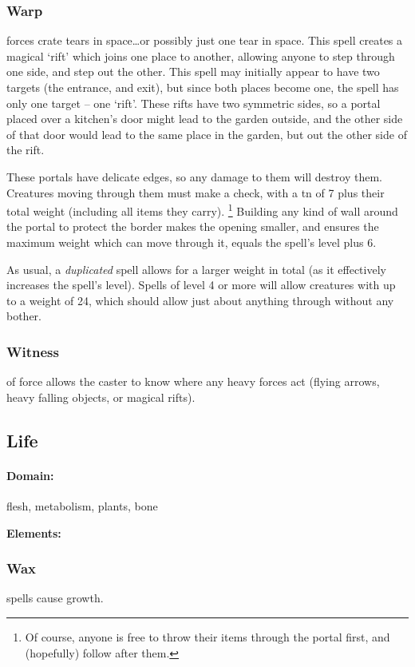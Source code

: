 \begin{multicols}{2}
\subsubsection{Warp}
forces crate tears in space\ldots or possibly just one tear in space.
This spell creates a magical `rift' which joins one place to another, allowing anyone to step through one side, and step out the other.
This spell may initially appear to have two targets (the entrance, and exit), but since both places become one, the spell has only one target -- one `rift'.
These rifts have two symmetric sides, so a portal placed over a kitchen's door might lead to the garden outside, and the other side of that door would lead to the same place in the garden, but out the other side of the rift.

These portals have delicate edges, so any damage to them will destroy them.
Creatures moving through them must make a  check, with a \gls{tn} of 7 plus their total \gls{weight} (including all items they carry).%
\footnote{Of course, anyone is free to throw their items through the portal first, and (hopefully) follow after them.}
Building any kind of wall around the portal to protect the border makes the opening smaller, and ensures the maximum \gls{weight} which can move through it, equals the spell's level plus 6.

As usual, a \textit{duplicated} spell allows for a larger \gls{weight} in total (as it effectively increases the spell's level).
Spells of level 4 or more will allow creatures with up to a \gls{weight} of 24, which should allow just about anything through without any bother.

\subsubsection{Witness}
of force allows the caster to know where any heavy forces act (flying arrows, heavy falling objects, or magical rifts).

\subsection{Life}
\paragraph{Domain:}
flesh, metabolism, plants, bone

\textbf{Elements:}

\subsubsection{Wax}
spells cause growth.


\end{multicols}
